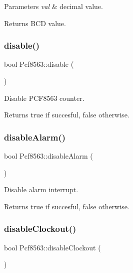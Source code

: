 \begin{DoxyParams}{Parameters}
{\em val} & decimal value. \\
\hline
\end{DoxyParams}
\begin{DoxyReturn}{Returns}
B\+CD value. 
\end{DoxyReturn}
\mbox{\label{namespacePcf8563_a1920171d3aec259327a124b712299a04}} 
\subsubsection{\texorpdfstring{disable()}{disable()}}
{\footnotesize\ttfamily bool Pcf8563\+::disable (\begin{DoxyParamCaption}{ }\end{DoxyParamCaption})}



Disable P\+C\+F8563 counter. 

\begin{DoxyReturn}{Returns}
true if succesful, false otherwise. 
\end{DoxyReturn}
\mbox{\label{namespacePcf8563_ad9dd3fe9bf1ab196090357b717c7207d}} 
\subsubsection{\texorpdfstring{disable\+Alarm()}{disableAlarm()}}
{\footnotesize\ttfamily bool Pcf8563\+::disable\+Alarm (\begin{DoxyParamCaption}{ }\end{DoxyParamCaption})}



Disable alarm interrupt. 

\begin{DoxyReturn}{Returns}
true if succesful, false otherwise. 
\end{DoxyReturn}
\mbox{\label{namespacePcf8563_a76c81b3e0f59f5e4e80dd8807c199856}} 
\subsubsection{\texorpdfstring{disable\+Clockout()}{disableClockout()}}
{\footnotesize\ttfamily bool Pcf8563\+::disable\+Clockout (\begin{DoxyParamCaption}{ }\end{DoxyParamCaption})}



